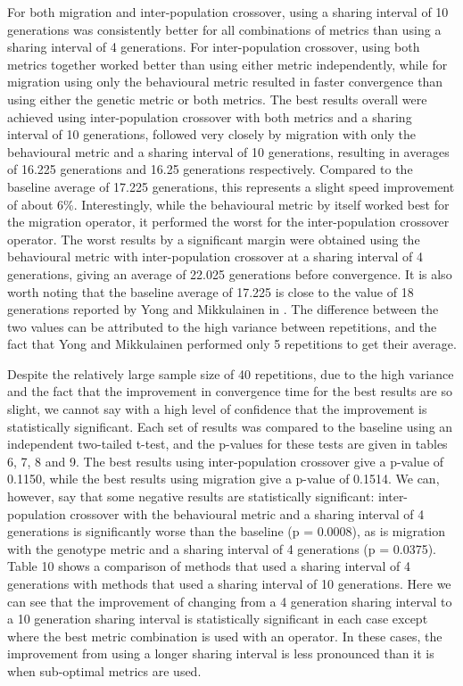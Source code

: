 \documentclass[12pt]{article} %
\begin{document}
For both migration and inter-population crossover, using a sharing interval of 10 generations was consistently better for all combinations of metrics than using a sharing interval of 4 generations. For inter-population crossover, using both metrics together worked better than using either metric independently, while for migration using only the behavioural metric resulted in faster convergence than using either the genetic metric or both metrics. The best results overall were achieved using inter-population crossover with both metrics and a sharing interval of 10 generations, followed very closely by migration with only the behavioural metric and a sharing interval of 10 generations, resulting in averages of 16.225 generations and 16.25 generations respectively. Compared to the baseline average of 17.225 generations, this represents a slight speed improvement of about 6\%. Interestingly, while the behavioural metric by itself worked best for the migration operator, it performed the worst for the inter-population crossover operator. The worst results by a significant margin were obtained using the behavioural metric with inter-population crossover at a sharing interval of 4 generations, giving an average of 22.025 generations before convergence. It is also worth noting that the baseline average of 17.225 is close to the value of 18 generations reported by Yong and Mikkulainen in \cite{Yong2001}. The difference between the two values can be attributed to the high variance between repetitions, and the fact that Yong and Mikkulainen performed only 5 repetitions to get their average.

Despite the relatively large sample size of 40 repetitions, due to the high variance and the fact that the improvement in convergence time for the best results are so slight, we cannot say with a high level of confidence that the improvement is statistically significant. Each set of results was compared to the baseline using an independent two-tailed t-test, and the p-values for these tests are given in tables 6, 7, 8 and 9. The best results using inter-population crossover give a p-value of 0.1150, while the best results using migration give a p-value of 0.1514. We can, however, say that some negative results are statistically significant: inter-population crossover with the behavioural metric and a sharing interval of 4 generations is significantly worse than the baseline (p = 0.0008), as is migration with the genotype metric and a sharing interval of 4 generations (p = 0.0375). Table 10 shows a comparison of methods that used a sharing interval of 4 generations with methods that used a sharing interval of 10 generations. Here we can see that the improvement of changing from a 4 generation sharing interval to a 10 generation sharing interval is statistically significant in each case except where the best metric combination is used with an operator. In these cases, the improvement from using a longer sharing interval is less pronounced than it is when sub-optimal metrics are used.
\end{document}
